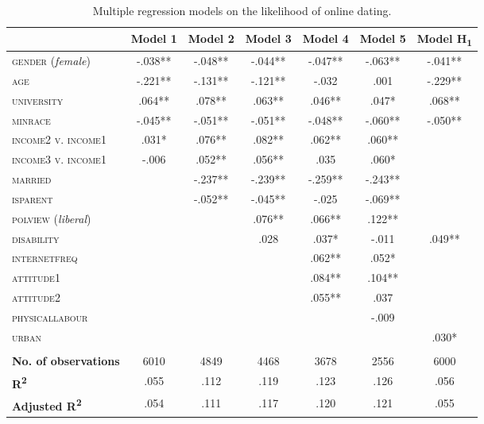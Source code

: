 \begin{table}[h]
\centering{}%
\begin{minipage}[t]{1\columnwidth}%
\begin{center}
\renewcommand{\arraystretch}{2}%
\begin{tabular}{lcccccc}
\hline 
 & {\small{}Model }\textbf{\small{}1} & {\small{}Model }\textbf{\small{}2} & {\small{}Model }\textbf{\small{}3} & {\small{}Model }\textbf{\small{}4} & {\small{}Model }\textbf{\small{}5} & {\small{}Model}\textbf{\small{} H}\textsubscript{\textbf{\small{}1}}\tabularnewline
\hline 
\hline 
\textsc{gender (}\textsl{female}\textsc{)} & -.038{*}{*} & -.048{*}{*} & -.044{*}{*} & -.047{*}{*} & -.063{*}{*} & -.041{*}{*}\tabularnewline
\textsc{age} & -.221{*}{*} & -.131{*}{*} & -.121{*}{*} & -.032 & .001 & -.229{*}{*}\tabularnewline
\textsc{university} & .064{*}{*} & .078{*}{*} & .063{*}{*} & .046{*}{*} & .047{*} & .068{*}{*}\tabularnewline
\textsc{minrace} & -.045{*}{*} & -.051{*}{*} & -.051{*}{*} & -.048{*}{*} & -.060{*}{*} & -.050{*}{*}\tabularnewline
\textsc{income2 v. income1} & .031{*} & .076{*}{*} & .082{*}{*} & .062{*}{*} & .060{*}{*} & \tabularnewline
\textsc{income3 v. income1} & -.006 & .052{*}{*} & .056{*}{*} & .035 & .060{*} & \tabularnewline
\textsc{married} &  & -.237{*}{*} & -.239{*}{*} & -.259{*}{*} & -.243{*}{*} & \tabularnewline
\textsc{isparent} &  & -.052{*}{*} & -.045{*}{*} & -.025 & -.069{*}{*} & \tabularnewline
\textsc{polview (}\textsl{liberal}\textsc{)} &  &  & .076{*}{*} & .066{*}{*} & .122{*}{*} & \tabularnewline
\textsc{disability} &  &  & .028 & .037{*} & -.011 & .049{*}{*}\tabularnewline
\textsc{internetfreq} &  &  &  & .062{*}{*} & .052{*} & \tabularnewline
\textsc{attitude1} &  &  &  & .084{*}{*} & .104{*}{*} & \tabularnewline
\textsc{attitude2} &  &  &  & .055{*}{*} & .037 & \tabularnewline
\textsc{physicallabour} &  &  &  &  & -.009 & \tabularnewline
\textsc{urban} &  &  &  &  &  & .030{*}\tabularnewline
 &  &  &  &  &  & \tabularnewline
\hline 
\textbf{No. of observations} & 6010 & 4849 & 4468 & 3678 & 2556 & 6000\tabularnewline
\textbf{R}\textsuperscript{\textbf{2}} & .055 & .112 & .119 & .123 & .126 & .056\tabularnewline
\textbf{Adjusted R}\textsuperscript{\textbf{2}} & .054 & .111 & .117 & .120 & .121 & .055\tabularnewline
\hline 
\end{tabular}\bigskip{}
\par\end{center}
\begin{center}
\caption{Multiple regression models on the likelihood of online dating.\label{tab:MRM-benchmark}}
\par\end{center}%
\end{minipage}
\end{table}


